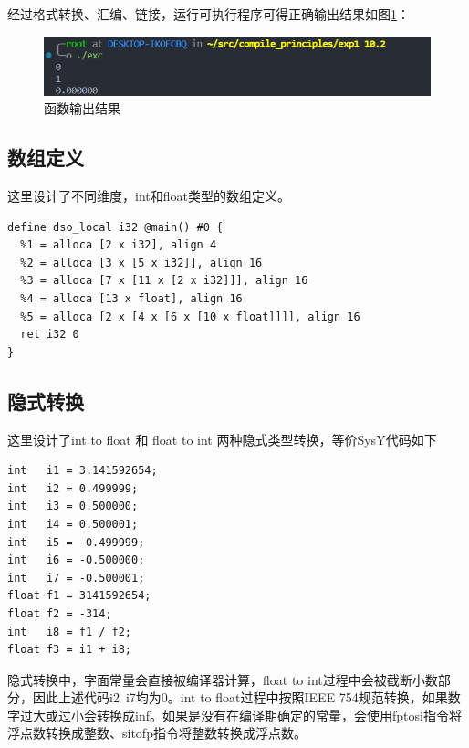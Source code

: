 \documentclass[UTF8,a4paper,10pt]{ctexart}
\begin{document}
经过格式转换、汇编、链接，运行可执行程序可得正确输出结果如图\ref{pic:6}：
\begin{figure}[H]
  \centering
  \includegraphics[width=\textwidth]{figure/exc.png}
  \caption{函数输出结果}
  \label{pic:6}
\end{figure}

\subsection{数组定义}

这里设计了不同维度，int和float类型的数组定义。

\begin{verbatim}
define dso_local i32 @main() #0 {
  %1 = alloca [2 x i32], align 4
  %2 = alloca [3 x [5 x i32]], align 16
  %3 = alloca [7 x [11 x [2 x i32]]], align 16
  %4 = alloca [13 x float], align 16
  %5 = alloca [2 x [4 x [6 x [10 x float]]]], align 16
  ret i32 0
}
\end{verbatim}

\subsection{隐式转换}

这里设计了int to float 和 float to int 两种隐式类型转换，等价SysY代码如下

\begin{verbatim}
int   i1 = 3.141592654;
int   i2 = 0.499999;
int   i3 = 0.500000;
int   i4 = 0.500001;
int   i5 = -0.499999;
int   i6 = -0.500000;
int   i7 = -0.500001;
float f1 = 3141592654;
float f2 = -314;
int   i8 = f1 / f2;
float f3 = i1 + i8;
\end{verbatim}

隐式转换中，字面常量会直接被编译器计算，float to int过程中会被截断小数部分，因此上述代码i2~i7均为0。int to float过程中按照IEEE 754规范转换，如果数字过大或过小会转换成inf。如果是没有在编译期确定的常量，会使用fptosi指令将浮点数转换成整数、sitofp指令将整数转换成浮点数。
\end{document}
